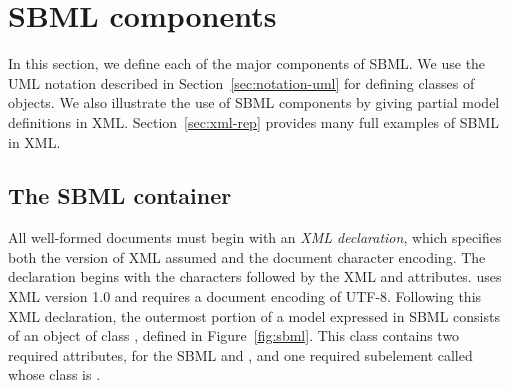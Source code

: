 
\section{SBML components}
\label{sec:elements}

In this section, we define each of the major components of SBML.
We use the UML notation described in
Section~\ref{sec:notation-uml} for defining classes of objects.
We also illustrate the use of SBML components by giving partial
model definitions in XML.  Section~\ref{sec:xml-rep} provides many
full examples of SBML in XML.


\subsection{The SBML container}
\label{sec:sbml}

All well-formed  documents must begin with an \emph{XML
  declaration}, which specifies both the version of XML assumed
and the document character encoding.  The declaration begins with
the characters  followed by the XML 
and  attributes.  \sbmltwo uses XML version 1.0
and requires a document encoding of UTF-8.  Following this XML
declaration, the outermost portion of a model expressed in SBML
\thisLV consists of an object of class \Sbml, defined in
Figure~\ref{fig:sbml}.  This class contains two required
attributes, for the SBML  and , and
one required subelement called  whose class is
\Model.

